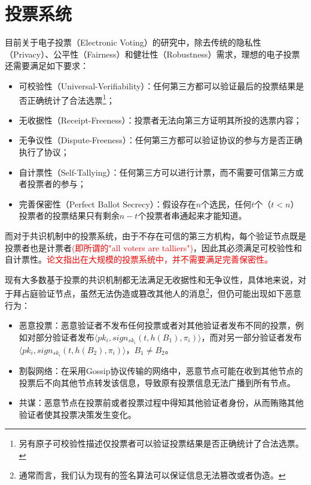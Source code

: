 \section{投票系统}
\label{ch:voting}
目前关于电子投票（Electronic Voting）的研究中\cite{kiayias2002self}，除去传统的隐私性（Privacy）、公平性（Fairness）和健壮性（Robustness）需求，理想的电子投票还需要满足如下要求：
\begin{itemize}
	\item 可校验性（Universal-Verifiability）：任何第三方都可以验证最后的投票结果是否正确统计了合法选票\footnote{另有原子可校验性描述仅投票者可以验证投票结果是否正确统计了合法选票。}；
	\item 无收据性（Receipt-Freeness）：投票者无法向第三方证明其所投的选票内容；
	\item 无争议性（Dispute-Freeness）：任何第三方都可以验证协议的参与方是否正确执行了协议；
	\item 自计票性（Self-Tallying）：任何第三方可以进行计票，而不需要可信第三方或者投票者的参与；
	\item 完善保密性（Perfect Ballot Secrecy）：假设存在$n$个选民，任何$t$个（$t<n$）投票者的投票结果只有剩余$n-t$个投票者串通起来才能知道。
\end{itemize}

而对于共识机制中的投票系统，由于不存在可信的第三方机构，每个验证节点既是投票者也是计票者\textcolor{red}{(即所谓的"all voters are talliers")}，因此其必须满足可校验性和自计票性。\textcolor{red}{论文\cite{kiayias2002self}指出在大规模的投票系统中，并不需要满足完善保密性。}

现有大多数基于投票的共识机制都无法满足无收据性和无争议性，具体地来说，对于拜占庭验证节点，虽然无法伪造或篡改其他人的消息\footnote{通常而言，我们认为现有的签名算法可以保证信息无法篡改或者伪造。}，但仍可能出现如下恶意行为：

\begin{itemize}
	\item 恶意投票：恶意验证者不发布任何投票或者对其他验证者发布不同的投票，例如对部分验证者发布$\langle pk_i,sign_{sk_i}(t,h(B_1),\pi_i) \rangle$，而对另一部分验证者发布$\langle pk_i,sign_{sk_i}(t,h(B_2),\pi_i) \rangle$，$B_1 \neq B_2$。
	\item 割裂网络：在采用Gossip协议传输的网络中，恶意节点可能在收到其他节点的投票后不向其他节点转发该信息，导致原有投票信息无法广播到所有节点。
	\item 共谋：恶意节点在投票前或者投票过程中得知其他验证者身份，从而贿赂其他验证者使其投票决策发生变化。
\end{itemize}

